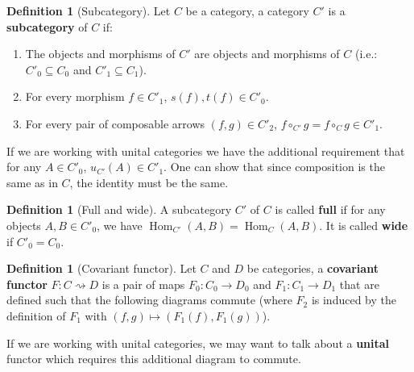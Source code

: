 \documentclass{scrartcl}
\theoremstyle{definition}
\newtheorem{defn}[thm]{Definition}
\theoremstyle{remark}
\DeclareMathOperator{\Hom}{Hom}
\begin{document}
\begin{defn}[Subcategory]
    Let $C$ be a category, a category $C'$ is a \textbf{subcategory} of $C$ if:
    \begin{enumerate}
        \item The objects and morphisms of $C'$ are objects and morphisms of $C$ (i.e.: $C'_0 \subseteq C_0$ and $C'_1 \subseteq C_1$).
        \item For every morphism $f \in C'_1$, $s(f), t(f) \in C'_0$.
        \item For every pair of composable arrows $(f,g) \in C'_2$, $f\circ_{C'} g = f \circ_{C} g \in C'_1$.
    \end{enumerate}
    If we are working with unital categories we have the additional requirement that for any $A \in C'_0$, $u_{C'}(A) \in C'_1$. One can show that since composition is the same as in $C$, the identity must be the same.
\end{defn}
\begin{defn}[Full and wide]
    A subcategory $C'$ of $C$ is called \textbf{full} if for any objects $A,B \in C'_0$, we have $\Hom_{C'}(A,B)  = \Hom_{C}(A,B)$. It is called \textbf{wide} if $C'_0 = C_0$.
\end{defn}
\begin{defn}[Covariant functor]\label{defcovfunc}
    Let $C$ and $D$ be categories, a \textbf{covariant functor} $F: C \rightsquigarrow D$ is a pair of maps $F_0:C_0 \rightarrow D_0$ and $F_1:C_1 \rightarrow D_1$ that are defined such that the following diagrams commute (where $F_2$ is induced by the definition of $F_1$ with $(f,g) \mapsto (F_1(f), F_1(g))$).
    \begin{figure}[h]
    \centering
    \qquad 
    \end{figure}
    
    If we are working with unital categories, we may want to talk about a \textbf{unital} functor which requires this additional diagram to commute.
    \begin{figure}[h]
        \centering
    \end{figure}
\end{defn}
\end{document}
